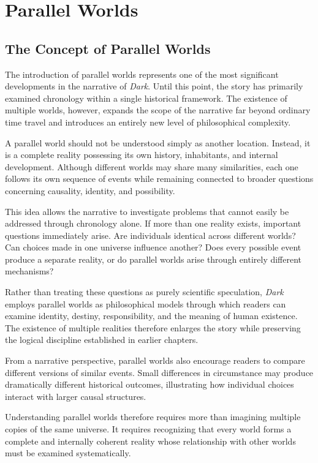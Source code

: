 \documentclass[12pt,oneside,openany]{book}
\begin{document}
\chapter{Parallel Worlds}
\section{The Concept of Parallel Worlds}

The introduction of parallel worlds represents one of the most significant
developments in the narrative of \textit{Dark}. Until this point, the story has
primarily examined chronology within a single historical framework. The
existence of multiple worlds, however, expands the scope of the narrative far
beyond ordinary time travel and introduces an entirely new level of
philosophical complexity.

A parallel world should not be understood simply as another location. Instead,
it is a complete reality possessing its own history, inhabitants, and internal
development. Although different worlds may share many similarities, each one
follows its own sequence of events while remaining connected to broader
questions concerning causality, identity, and possibility.

This idea allows the narrative to investigate problems that cannot easily be
addressed through chronology alone. If more than one reality exists, important
questions immediately arise. Are individuals identical across different worlds?
Can choices made in one universe influence another? Does every possible event
produce a separate reality, or do parallel worlds arise through entirely
different mechanisms?

Rather than treating these questions as purely scientific speculation,
\textit{Dark} employs parallel worlds as philosophical models through which
readers can examine identity, destiny, responsibility, and the meaning of
human existence. The existence of multiple realities therefore enlarges the
story while preserving the logical discipline established in earlier chapters.

From a narrative perspective, parallel worlds also encourage readers to compare
different versions of similar events. Small differences in circumstance may
produce dramatically different historical outcomes, illustrating how individual
choices interact with larger causal structures.

Understanding parallel worlds therefore requires more than imagining multiple
copies of the same universe. It requires recognizing that every world forms a
complete and internally coherent reality whose relationship with other worlds
must be examined systematically.
\end{document}
